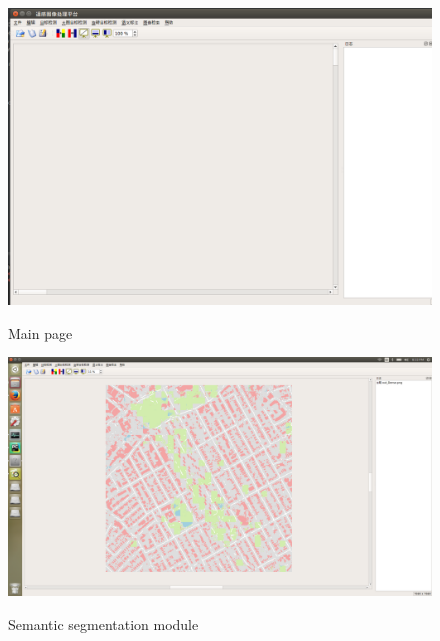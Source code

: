 \documentclass[]{IEEEtran}
\begin{document}
\begin{figure}[!hbt]
		\vspace{0.3cm}
		\begin{center}
			\includegraphics[width=\columnwidth]{full}
			\caption{Main page}
			\label{fig:mp}
		    \hspace{0.5cm}
			\includegraphics[width=\columnwidth]{ss}
			\caption{Semantic segmentation module}
			\label{fig:ss}
		\end{center}
	\end{figure}
\end{document}
